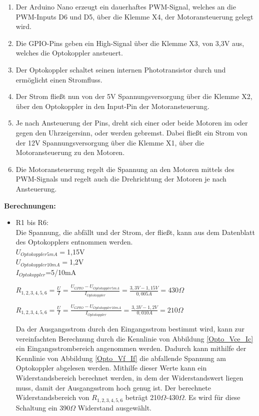 \begin{enumerate}
\item Der Arduino Nano erzeugt ein dauerhaftes PWM-Signal, welches an die PWM-Inputs D6 und D5, über die Klemme X4, der Motoransteuerung gelegt wird.
\item Die GPIO-Pins geben ein High-Signal über die Klemme X3, von 3,3V aus, welches die Optokoppler ansteuert. 
\item Der Optokoppler schaltet seinen internen Phototransistor durch und ermöglicht einen Stromfluss.
\item Der Strom fließt nun von der 5V Spannungsversorgung über die Klemme X2, über den Optokoppler in den Input-Pin der Motoransteuerung.
\item Je nach Ansteuerung der Pins, dreht sich einer oder beide Motoren im oder gegen den Uhrzeigersinn, oder werden gebremst. Dabei fließt ein Strom von der 12V Spannungsversorgung über die Klemme X1, über die Motoransteuerung zu den Motoren.
\item Die Motoransteuerung regelt die Spannung an den Motoren mittels des PWM-Signals und regelt auch die Drehrichtung der Motoren je nach Ansteuerung.
\end{enumerate}
\textbf{Berechnungen:}
\begin{itemize}
\item R1 bis R6: \\
Die Spannung, die abfällt und der Strom, der fließt, kann aus dem Datenblatt des Optokopplers entnommen werden.\\
$U_{Optokoppler 5mA}=$1,15V \\
$U_{Optokoppler 10mA}=$1,2V \\
$I_{Optokoppler}$=5/10mA \\

\begin{center}
$R_{1,2,3,4,5,6}=\frac{U}{I}=\frac{U_{GPIO}-U_{Optokoppler 5mA}}{I_{Optokoppler}}=\frac{3,3V-1,15V}{0,005A}=430\Omega$
\end{center}

\begin{center}
$R_{1,2,3,4,5,6}=\frac{U}{I}=\frac{U_{GPIO}-U_{Optokoppler 10mA}}{I_{Optokoppler}}=\frac{3,3V-1,2V}{0,010A}=210\Omega$
\end{center}

Da der Ausgangsstrom durch den Eingangsstrom bestimmt wird, kann zur vereinfachten Berechnung durch die Kennlinie von Abbildung \ref{Opto_Vce_Ic} ein Eingangsstrombereich angenommen werden. Dadurch kann mithilfe der Kennlinie von Abbildung \ref{Opto_Vf_If} die abfallende Spannung am Optokoppler abgelesen werden. Mithilfe dieser Werte kann ein Widerstandsbereich berechnet werden, in dem der Widerstandswert liegen muss, damit der Ausgangsstrom hoch genug ist. Der berechnete Widerstandsbereich von $R_{1,2,3,4,5,6}$ beträgt 210$\Omega$-430$\Omega$. Es wird für diese Schaltung ein 390$\Omega$ Widerstand ausgewählt.
\end{itemize}

